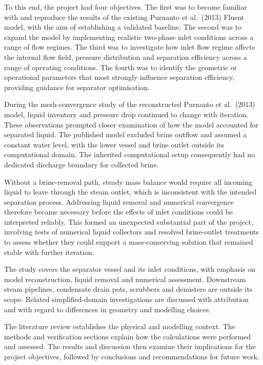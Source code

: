 To this end, the project had four objectives. The first was to become familiar with and reproduce the results of the existing Purnanto et al.~(2013) Fluent model, with the aim of establishing a validated baseline. The second was to expand the model by implementing realistic two-phase inlet conditions across a range of flow regimes. The third was to investigate how inlet flow regime affects the internal flow field, pressure distribution and separation efficiency across a range of operating conditions. The fourth was to identify the geometric or operational parameters that most strongly influence separation efficiency, providing guidance for separator optimisation.

During the mesh-convergence study of the reconstructed Purnanto et al.~(2013) model, liquid inventory and pressure drop continued to change with iteration. These observations prompted closer examination of how the model accounted for separated liquid. The published model excluded brine outflow and assumed a constant water level, with the lower vessel and brine outlet outside its computational domain. The inherited computational setup consequently had no dedicated discharge boundary for collected brine.

Without a brine-removal path, steady mass balance would require all incoming liquid to leave through the steam outlet, which is inconsistent with the intended separation process. Addressing liquid removal and numerical convergence therefore became necessary before the effects of inlet conditions could be interpreted reliably. This formed an unexpected substantial part of the project, involving tests of numerical liquid collectors and resolved brine-outlet treatments to assess whether they could support a mass-conserving solution that remained stable with further iteration.

The study covers the separator vessel and its inlet conditions, with emphasis on model reconstruction, liquid removal and numerical assessment. Downstream steam pipelines, condensate drain pots, scrubbers and demisters are outside its scope. Related simplified-domain investigations are discussed with attribution and with regard to differences in geometry and modelling choices.

The literature review establishes the physical and modelling context. The methods and verification sections explain how the calculations were performed and assessed. The results and discussion then examine their implications for the project objectives, followed by conclusions and recommendations for future work.
